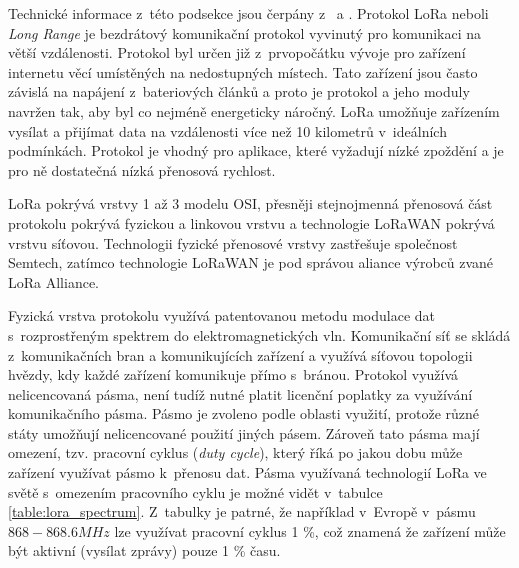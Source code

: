  \label{sec:lora}
Technické informace z~této podsekce jsou čerpány z~\cite{lavric2018lorawan_POV4} a \cite{devalal2018lora}. Protokol LoRa neboli \textit{Long Range} je bezdrátový komunikační protokol vyvinutý pro komunikaci na větší vzdálenosti. Protokol byl určen již z~prvopočátku vývoje pro zařízení internetu věcí umístěných na nedostupných místech. Tato zařízení jsou často závislá na napájení z~bateriových článků a proto je protokol a jeho moduly navržen tak, aby byl co nejméně energeticky náročný. LoRa umožňuje zařízením vysílat a přijímat data na vzdálenosti více než 10 kilometrů v~ideálních podmínkách. Protokol je vhodný pro aplikace, které vyžadují nízké zpoždění a je pro ně dostatečná nízká přenosová rychlost.

LoRa pokrývá vrstvy 1 až 3 modelu OSI, přesněji stejnojmenná přenosová část protokolu pokrývá fyzickou a linkovou vrstvu a technologie LoRaWAN pokrývá vrstvu síťovou. Technologii fyzické přenosové vrstvy zastřešuje společnost Semtech, zatímco technologie LoRaWAN je pod správou aliance výrobců zvané LoRa Alliance.

Fyzická vrstva protokolu využívá patentovanou metodu modulace dat s~rozprostřeným spektrem do elektromagnetických vln. Komunikační síť se skládá z~komunikačních bran a komunikujících zařízení a využívá síťovou topologii hvězdy, kdy každé zařízení komunikuje přímo s~bránou. Protokol využívá nelicencovaná pásma, není tudíž nutné platit licenční poplatky za využívání komunikačního pásma. Pásmo je zvoleno podle oblasti využití, protože různé státy umožňují nelicencované použití jiných pásem. Zároveň tato pásma mají omezení, tzv. pracovní cyklus (\textit{duty cycle}), který říká po jakou dobu může zařízení využívat pásmo k~přenosu dat. Pásma využívaná technologií LoRa ve světě s~omezením pracovního cyklu je možné vidět v~tabulce \ref{table:lora_spectrum}. Z~tabulky je patrné, že například v~Evropě v~pásmu $868-868.6 MHz$ lze využívat pracovní cyklus 1 \%, což znamená že zařízení může být aktivní (vysílat zprávy) pouze 1 \% času.

